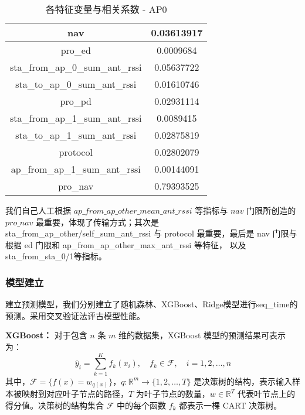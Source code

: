 \documentclass[bwprint]{gmcmthesis}
\begin{document}
\begin{table}[htp!]
\begin{minipage}{0.45\textwidth}
\begin{tabular}{|c|c|}
            \hline
            nav & 0.03613917 \\
            \hline
            pro\_ed & 0.0009684 \\
            \hline
            sta\_from\_ap\_0\_sum\_ant\_rssi & 0.05637722 \\
            \hline
            sta\_to\_ap\_0\_sum\_ant\_rssi & 0.01610746 \\
            \hline
            pro\_pd & 0.02931114 \\
            \hline
            sta\_from\_ap\_1\_sum\_ant\_rssi & 0.0089415 \\
            \hline
            sta\_to\_ap\_1\_sum\_ant\_rssi & 0.02875819 \\
            \hline
            protocol & 0.02802079 \\
            \hline
            ap\_from\_ap\_1\_sum\_ant\_rssi & 0.00144091 \\
            \hline
            pro\_nav & 0.79393525 \\
            \hline
        \end{tabular}
        \caption{各特征变量与相关系数 - AP0}
        \label{tab:corresponding_values_ap0}
    \end{minipage}
\end{table}



我们自己人工根据 $ap\_from\_ap\_other\_mean\_ant\_rssi$ 等指标与 $nav$ 门限所创造的 $pro\_nav$ 最重要，体现了传输方式；其次是 sta\_from\_ap\_other/self\_sum\_ant\_rssi 与 protocol 最重要，最后是 nav 门限与根据 ed 门限和 ap\_from\_ap\_other\_max\_ant\_rssi 等特征，
以及sta\_from\_sta\_0/1等指标。

 \subsubsection{模型建立}
 建立预测模型，我们分别建立了随机森林、XGBoost、Ridge模型进行seq\_time的预测。采用交叉验证法评古模型性能。

 \textbf{XGBoost：}
 对于包含 $n$ 条 $m$ 维的数据集，XGBoost 模型的预测结果可表示为：
 \[
 \hat{y}_i = \sum_{k=1}^{K} f_k(x_i), \quad f_k \in \mathcal{F}, \quad i = 1, 2, \dots, n
 \]
 其中，$\mathcal{F} = \{ f(x) = w_{q(x)} \}$，$q : \mathbb{R}^m \to \{1, 2, \dots, T\}$ 是决策树的结构，表示输入样本被映射到对应叶子节点的路径，$T$ 为叶子节点的数量，$w \in \mathbb{R}^T$ 代表叶节点上的得分值。决策树的结构集合 $\mathcal{F}$ 中的每个函数 $f_k$ 都表示一棵 CART 决策树。
 
\end{document}
